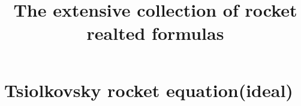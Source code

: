 \documentclass{paper}
\begin{document}
\title{The extensive collection of rocket realted formulas}
\maketitle
\tableofcontents
\newpage
\section{Tsiolkovsky rocket equation(ideal)}

\end{document}
